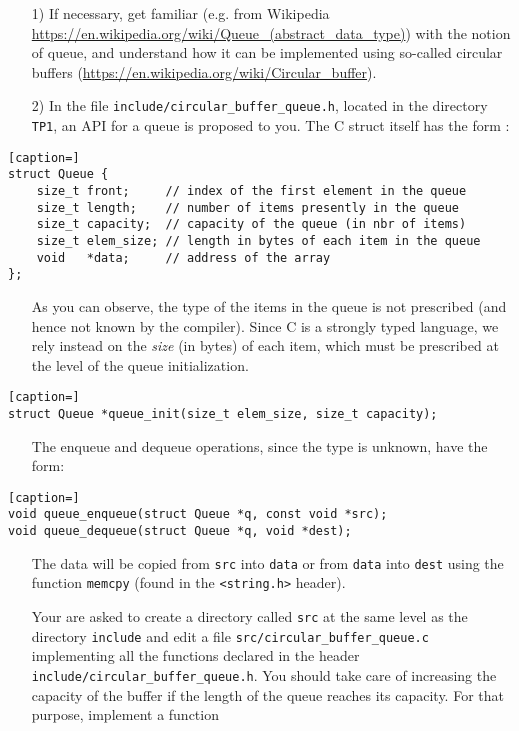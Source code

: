 \documentclass[a4paper,12pt]{article}
\begin{document}
\begin{enumerate}
	\item[1)] If necessary, get familiar (e.g. from Wikipedia  \url{https://en.wikipedia.org/wiki/Queue_(abstract_data_type)}) with the notion of queue, and understand how it can be implemented using so-called circular buffers (\url{https://en.wikipedia.org/wiki/Circular_buffer}).

	\item[2)] In the file {\tt include/circular\_buffer\_queue.h}, located in the directory {\tt TP1}, an API for a queue is proposed to you. The C struct itself has the form :
\end{enumerate}
\begin{lstlisting}[caption=]
struct Queue {
	size_t front;     // index of the first element in the queue
	size_t length;    // number of items presently in the queue
	size_t capacity;  // capacity of the queue (in nbr of items)
	size_t elem_size; // length in bytes of each item in the queue
	void   *data;     // address of the array
};
\end{lstlisting}
\begin{enumerate}
\item[] As you can observe, the type of the items in the queue is not prescribed (and hence not known by the compiler). Since C is a strongly typed language, we rely instead on the {\it size} (in bytes) of each item, which must be prescribed at the level of the queue initialization.
\end{enumerate}
\begin{lstlisting}[caption=]
struct Queue *queue_init(size_t elem_size, size_t capacity);
\end{lstlisting}
\begin{enumerate}
\item[] The enqueue and dequeue operations, since the type is unknown, have the form:
\end{enumerate}
\begin{lstlisting}[caption=]
void queue_enqueue(struct Queue *q, const void *src);
void queue_dequeue(struct Queue *q, void *dest);
\end{lstlisting}
\begin{enumerate}
	\item[] The data will be copied from {\tt src} into {\tt data} or from {\tt data} into {\tt dest} using the function {\tt memcpy} (found in the {\tt <string.h>} header).

Your are asked to create a directory called {\tt src} at the same level as the directory {\tt include} and edit a file {\tt src/circular\_buffer\_queue.c} implementing all the functions declared in the header 
{\tt include/circular\_buffer\_queue.h}. You should take care of increasing the capacity of the buffer if the length of the queue reaches its capacity. For that purpose, implement a function 
\end{enumerate}
\end{document}
